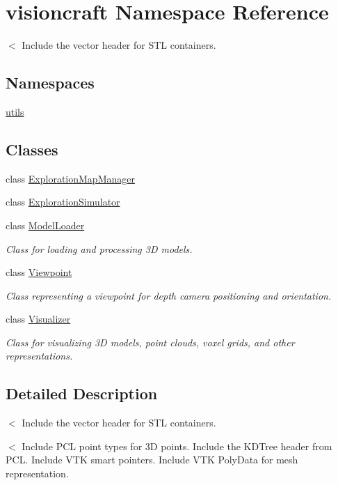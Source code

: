 \hypertarget{namespacevisioncraft}{}\section{visioncraft Namespace Reference}
\label{namespacevisioncraft}


$<$ Include the vector header for S\+TL containers.  


\subsection*{Namespaces}
\begin{DoxyCompactItemize}
\item 
 \hyperlink{namespacevisioncraft_1_1utils}{utils}
\end{DoxyCompactItemize}
\subsection*{Classes}
\begin{DoxyCompactItemize}
\item 
class \hyperlink{classvisioncraft_1_1ExplorationMapManager}{Exploration\+Map\+Manager}
\item 
class \hyperlink{classvisioncraft_1_1ExplorationSimulator}{Exploration\+Simulator}
\item 
class \hyperlink{classvisioncraft_1_1ModelLoader}{Model\+Loader}
\begin{DoxyCompactList}\small\item\em Class for loading and processing 3D models. \end{DoxyCompactList}\item 
class \hyperlink{classvisioncraft_1_1Viewpoint}{Viewpoint}
\begin{DoxyCompactList}\small\item\em Class representing a viewpoint for depth camera positioning and orientation. \end{DoxyCompactList}\item 
class \hyperlink{classvisioncraft_1_1Visualizer}{Visualizer}
\begin{DoxyCompactList}\small\item\em Class for visualizing 3D models, point clouds, voxel grids, and other representations. \end{DoxyCompactList}\end{DoxyCompactItemize}


\subsection{Detailed Description}
$<$ Include the vector header for S\+TL containers. 

$<$ Include P\+CL point types for 3D points. Include the K\+D\+Tree header from P\+CL. Include V\+TK smart pointers. Include V\+TK Poly\+Data for mesh representation. 